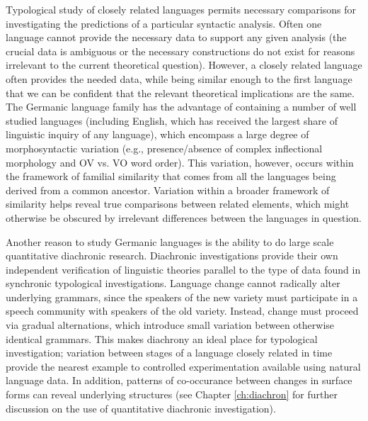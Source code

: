 Typological study of closely related languages permits necessary comparisons for investigating the predictions of a particular syntactic analysis. Often one language cannot provide the necessary data to support any given analysis (the crucial data is ambiguous or the necessary constructions do not exist for reasons irrelevant to the current theoretical question). However, a closely related language often provides the needed data, while being similar enough to the first language that we can be confident that the relevant theoretical implications are the same. The Germanic language family has the advantage of containing a number of well studied languages (including English, which has received the largest share of linguistic inquiry of any language), which encompass a large degree of morphosyntactic variation (e.g., presence/absence of complex inflectional morphology and OV vs. VO word order). This variation, however, occurs within the framework of familial similarity that comes from all the languages being derived from a common ancestor. Variation within a broader framework of similarity helps reveal true comparisons between related elements, which might otherwise be obscured by irrelevant differences between the languages in question.

Another reason to study Germanic languages is the ability to do large scale quantitative diachronic research. Diachronic investigations provide their own independent verification of linguistic theories parallel to the type of data found in synchronic typological investigations. Language change cannot radically alter underlying grammars, since the speakers of the new variety must participate in a speech community with speakers of the old variety. Instead, change must proceed via gradual alternations, which introduce small variation between otherwise identical grammars. This makes diachrony an ideal place for typological investigation; variation between stages of a language closely related in time provide the nearest example to controlled experimentation available using natural language data. In addition, patterns of co-occurance between changes in surface forms can reveal underlying structures (see Chapter \ref{ch:diachron} for further discussion on the use of quantitative diachronic investigation).

